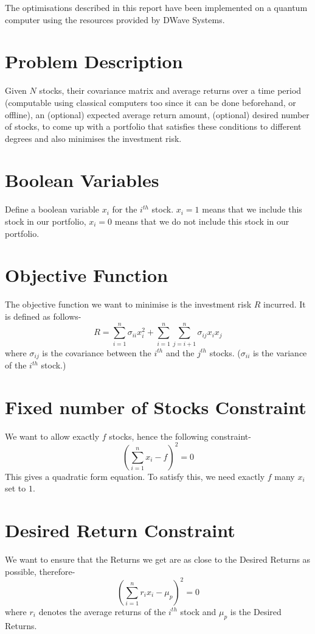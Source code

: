 \documentclass[a4paper]{report}
\begin{document}
The optimisations described in this report have been implemented on a quantum computer using the resources provided by DWave Systems.

\section{Problem Description}
Given $N$ stocks, their covariance matrix and average returns over a time period (computable using classical computers too since it can be done beforehand, or offline),
an (optional) expected average return amount, (optional) desired number of stocks, to come up with a portfolio that satisfies
these conditions to different degrees and also minimises the investment risk.

\section{Boolean Variables}
Define a boolean variable $x_i$ for the $i^{th}$ stock. $x_i = 1$ means that we include this stock in our portfolio, 
$x_i = 0$ means that we do not include this stock in our portfolio.

\section{Objective Function}
The objective function we want to minimise is the investment risk $R$ incurred. It is defined as follows-
$$ R = \sum\limits_{i = 1}^{n}\sigma_{ii}x_i^2 + \sum\limits_{i = 1}^{n}\sum\limits_{j = i + 1}^{n}\sigma_{ij}x_ix_j$$
where $\sigma_{ij}$ is the covariance between the $i^{th}$ and the $j^{th}$ stocks. ($\sigma_{ii}$ is the variance of
the $i^{th}$ stock.)
\section{Fixed number of Stocks Constraint}
We want to allow exactly $f$ stocks, hence the following constraint-
$$(\sum\limits_{i = 1}^{n} x_i - f)^2 = 0$$
This gives a quadratic form equation. To satisfy this, we need exactly $f$ many $x_i$ set to $1$.
\section{Desired Return Constraint}
We want to ensure that the Returns we get are as close to the Desired Returns as possible, therefore-
$$(\sum\limits_{i = 1}^{n} r_i x_i - \mu_p)^2 = 0$$
where $r_i$ denotes the average returns of the $i^{th}$ stock and $\mu_p$ is the Desired Returns.
\end{document}
